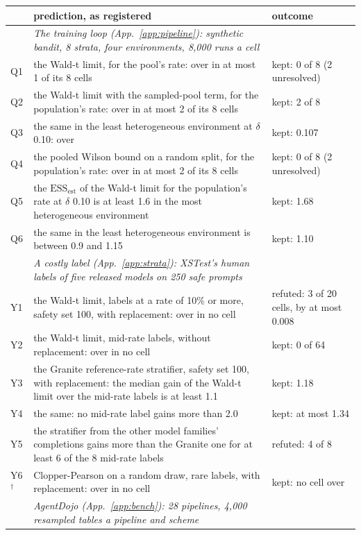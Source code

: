 \begin{tabular}{@{}l p{7.4cm} p{7.4cm}@{}}
\toprule
 & \textbf{prediction, as registered} & \textbf{outcome} \\
\midrule
 & \emph{The training loop (App.~\ref{app:pipeline}): synthetic bandit, 8 strata, four environments, 8,000 runs a cell} &  \\
Q1 & the Wald-t limit, for the pool's rate: over in at most 1 of its 8 cells & kept: 0 of 8 (2 unresolved) \\
Q2 & the Wald-t limit with the sampled-pool term, for the population's rate: over in at most 2 of its 8 cells & kept: 2 of 8 \\
Q3 & the same in the least heterogeneous environment at $\delta$ 0.10: over & kept: 0.107 \\
Q4 & the pooled Wilson bound on a random split, for the population's rate: over in at most 2 of its 8 cells & kept: 0 of 8 (2 unresolved) \\
Q5 & the $\mathrm{ESS}_{\mathrm{est}}$ of the Wald-t limit for the population's rate at $\delta$ 0.10 is at least 1.6 in the most heterogeneous environment & kept: 1.68 \\
Q6 & the same in the least heterogeneous environment is between 0.9 and 1.15 & kept: 1.10 \\
 & \emph{A costly label (App.~\ref{app:strata}): XSTest's human labels of five released models on 250 safe prompts} &  \\
Y1 & the Wald-t limit, labels at a rate of 10\% or more, safety set 100, with replacement: over in no cell & refuted: 3 of 20 cells, by at most 0.008 \\
Y2 & the Wald-t limit, mid-rate labels, without replacement: over in no cell & kept: 0 of 64 \\
Y3 & the Granite reference-rate stratifier, safety set 100, with replacement: the median gain of the Wald-t limit over the mid-rate labels is at least 1.1 & kept: 1.18 \\
Y4 & the same: no mid-rate label gains more than 2.0 & kept: at most 1.34 \\
Y5 & the stratifier from the other model families' completions gains more than the Granite one for at least 6 of the 8 mid-rate labels & refuted: 4 of 8 \\
Y6$^\dagger$ & Clopper-Pearson on a random draw, rare labels, with replacement: over in no cell & kept: no cell over \\
 & \emph{AgentDojo (App.~\ref{app:bench}): 28 pipelines, 4,000 resampled tables a pipeline and scheme} &  \\

\end{tabular}
